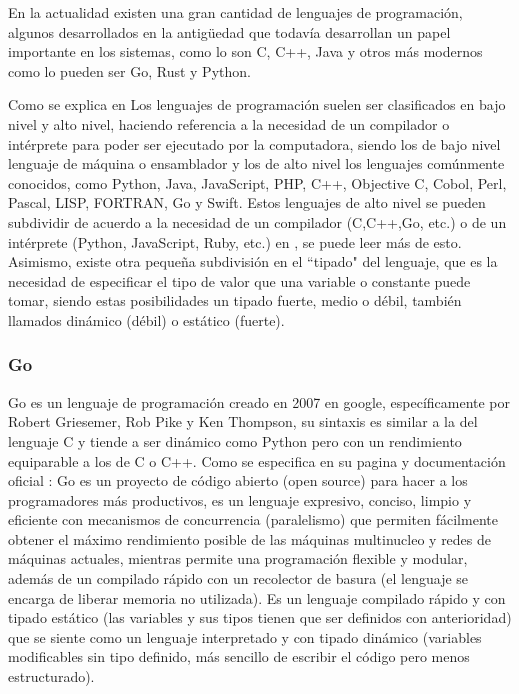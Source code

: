 En la actualidad existen una gran cantidad de lenguajes de programación, algunos
desarrollados en la antigüedad que todavía desarrollan un papel importante en
los sistemas, como lo son C, C++, Java y otros más modernos como lo pueden ser
Go, Rust y Python.

Como se explica en \cite{javaTpoint}
Los lenguajes de programación suelen ser clasificados en bajo nivel y alto nivel,
haciendo referencia a la necesidad de un compilador o intérprete para poder ser
ejecutado por la computadora, siendo los de bajo nivel lenguaje de máquina o
ensamblador y los de alto nivel los lenguajes comúnmente conocidos, como
Python, Java, JavaScript, PHP, C++, Objective C, Cobol, Perl, Pascal, LISP,
FORTRAN, Go y Swift. Estos lenguajes de alto nivel se pueden subdividir
de acuerdo a la necesidad de un compilador (C,C++,Go, etc.) o de un intérprete
(Python, JavaScript, Ruby, etc.) en \cite{LenguajesCompiladosEInterpretados}, se
puede leer más de esto. Asimismo, existe otra pequeña subdivisión en el ``tipado"
del lenguaje, que es la necesidad de especificar el tipo de valor que una
variable o constante puede tomar, siendo estas posibilidades un tipado fuerte,
medio o débil, también llamados dinámico (débil) o estático (fuerte).


\subsubsection{Go}
Go es un lenguaje de programación creado en 2007 en google, específicamente por
Robert Griesemer, Rob Pike y Ken Thompson, su sintaxis es similar a la del lenguaje
C y tiende a ser dinámico como Python pero con un rendimiento equiparable a los
de C o C++. Como se especifica en su pagina y documentación oficial
\cite{GolangDocumentacion}: Go es un proyecto de código abierto (open source)
para hacer a los programadores más productivos, es un lenguaje expresivo, conciso,
limpio y eficiente con mecanismos de concurrencia (paralelismo) que permiten fácilmente
obtener el máximo rendimiento posible de las máquinas multinucleo y redes de máquinas
actuales, mientras permite una programación flexible y modular, además de un compilado
rápido con un recolector de basura (el lenguaje se encarga de liberar memoria
no utilizada).
Es un lenguaje compilado rápido y con tipado estático (las variables y sus tipos tienen que
ser definidos con anterioridad) que se siente como un lenguaje interpretado y
con tipado dinámico (variables modificables sin tipo definido, más sencillo de
escribir el código pero menos estructurado).

